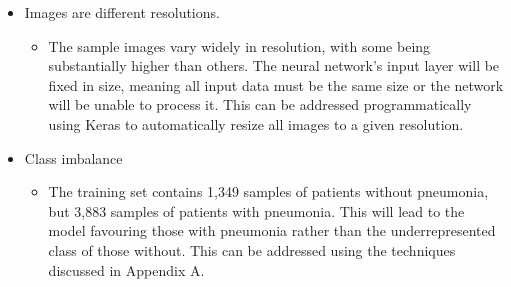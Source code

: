 \documentclass[12pt]{report}
\begin{document}
\begin{itemize}
    \item Images are different resolutions.
    \begin{itemize}
        \item The sample images vary widely in resolution, with some being substantially higher than others.
        The neural network's input layer will be fixed in size, meaning all input data must be the 
        same size or the network will be unable to process it. This can be addressed programmatically using Keras to automatically resize 
        all images to a given resolution.
    \end{itemize}
    \item Class imbalance
    \begin{itemize}
        \item The training set contains 1,349 samples of patients without pneumonia, but 3,883 samples of patients with pneumonia.
        This will lead to the model favouring those with pneumonia rather than the underrepresented class of those without. This can be addressed 
        using the techniques discussed in Appendix A.
    \end{itemize}
\end{itemize}



\end{document}
